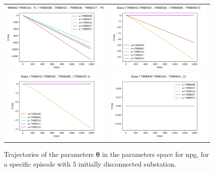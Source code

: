 \begin{figure}[!htp]
    \centering
    \begin{tabular}{cc}
        \includegraphics[height=0.27\textwidth,valign=b]{chapters/figures/theta_NPG_state_0.png} &
        \includegraphics[height=0.27\textwidth,valign=b]{chapters/figures/theta_NPG_state_1.png} \\
        \includegraphics[height=0.27\textwidth,valign=b]{chapters/figures/theta_NPG_state_2.png} &
        \includegraphics[height=0.27\textwidth,valign=b]{chapters/figures/theta_NPG_state_3.png}
    \end{tabular}
    \caption{Trajectories of the parameters $\boldsymbol \theta$ in the parameters space for \acrshort{npg}, for a specific episode with $5$ initially disconnected substation.}
    \label{fig:sequence-theta-npg}
\end{figure}

